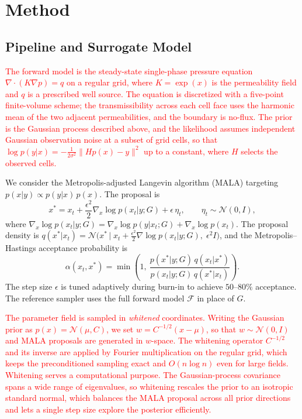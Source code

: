\documentclass[12pt]{article}
\newcommand{\add}[1]{\textcolor{red}{#1}}
\begin{document}
\section{Method}

\subsection{Pipeline and Surrogate Model}

\add{The forward model is the steady-state single-phase pressure equation $\nabla\cdot(K\nabla p)=q$ on a regular grid, where $K=\exp(x)$ is the permeability field and $q$ is a prescribed well source. The equation is discretized with a five-point finite-volume scheme; the transmissibility across each cell face uses the harmonic mean of the two adjacent permeabilities, and the boundary is no-flux. The prior is the Gaussian process described above, and the likelihood assumes independent Gaussian observation noise at a subset of grid cells, so that $\log p(y|x)=-\frac{1}{2\sigma^{2}}\|H p(x)-y\|^{2}$ up to a constant, where $H$ selects the observed cells.}

We consider the Metropolis-adjusted Langevin algorithm (MALA) targeting $p(x|y)\propto p(y|x)\,p(x)$. The proposal is
\begin{equation}
x^{*}=x_{t}+\frac{\epsilon^{2}}{2}\nabla_{x}\log p(x_{t}|y;G)+\epsilon\,\eta_{t},\qquad \eta_{t}\sim\mathcal{N}(0,I),
\end{equation}
where $\nabla_{x}\log p(x_{t}|y;G)=\nabla_{x}\log p(y|x_{t};G)+\nabla_{x}\log p(x_{t})$. The proposal density is $q(x^{*}|x_{t})=\mathcal{N}\big(x^{*}\,\big|\;x_{t}+\tfrac{\epsilon^{2}}{2}\nabla\log p(x_{t}|y;G),\;\epsilon^{2}I\big)$, and the Metropolis--Hastings acceptance probability is
\begin{equation}
\alpha(x_{t},x^{*})=\min\left(1,\ \frac{p(x^{*}|y;G)\,q(x_{t}|x^{*})}{p(x_{t}|y;G)\,q(x^{*}|x_{t})}\right).
\end{equation}
The step size $\epsilon$ is tuned adaptively during burn-in to achieve $50$--$80\%$ acceptance. The reference sampler uses the full forward model $\mathcal{F}$ in place of $G$.

\add{The parameter field is sampled in \emph{whitened} coordinates. Writing the Gaussian prior as $p(x)=\mathcal{N}(\mu,C)$, we set $w=C^{-1/2}(x-\mu)$, so that $w\sim\mathcal{N}(0,I)$ and MALA proposals are generated in $w$-space. The whitening operator $C^{-1/2}$ and its inverse are applied by Fourier multiplication on the regular grid, which keeps the preconditioned sampling exact and $O(n\log n)$ even for large fields. \add{Whitening serves a computational purpose. The Gaussian-process covariance spans a wide range of eigenvalues, so whitening rescales the prior to an isotropic standard normal, which balances the MALA proposal across all prior directions and lets a single step size explore the posterior efficiently.}}
\end{document}
